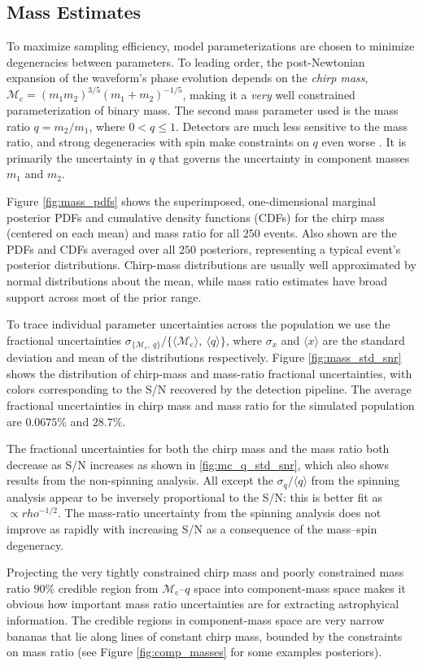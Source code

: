 \subsection{Mass Estimates}\label{sec:mass}
To maximize sampling efficiency, model parameterizations are chosen to minimize degeneracies between parameters.  To leading order, the post-Newtonian expansion of the waveform's phase evolution depends on the \emph{chirp mass}, $\mathcal{M}_\mathrm{c} = (m_1 m_2)^{3/5} (m_1 + m_2)^{-1/5}$, making it a \emph{very} well constrained parameterization of binary mass.  The second mass parameter used is the mass ratio $q = m_2/m_1$, where $0 < q \leq 1$.  Detectors are much less sensitive to the mass ratio, and strong degeneracies with spin make constraints on $q$ even worse \citep{Cutler_1994}.  It is primarily the uncertainty in $q$ that governs the uncertainty in component masses $m_1$ and $m_2$.

Figure \ref{fig:mass_pdfs} shows the superimposed, one-dimensional marginal posterior PDFs and cumulative density functions (CDFs) for the chirp mass (centered on each mean) and mass ratio for all $250$ events.  Also shown are the PDFs and CDFs averaged over all $250$ posteriors, representing a typical event's posterior distributions.  Chirp-mass distributions are usually well approximated by normal distributions about the mean, while mass ratio estimates have broad support across most of the prior range.

To trace individual parameter uncertainties across the population we use the fractional uncertainties $\sigma_{\{\mathcal{M}_\mathrm{c},~q\}}/\{\langle\mathcal{M}_\mathrm{c}\rangle,~\langle q\rangle\}$, where $\sigma_x$ and $\langle x\rangle$ are the standard deviation and mean of the distributions respectively.  Figure \ref{fig:mass_std_snr} shows the distribution of chirp-mass and mass-ratio fractional uncertainties, with colors corresponding to the S/N recovered by the detection pipeline. The average fractional uncertainties in chirp mass and mass ratio for the simulated population are $0.0675\%$ and $28.7\%$.

The fractional uncertainties for both the chirp mass and the mass ratio both decrease as S/N increases as shown in \ref{fig:mc_q_std_snr}, which also shows results from the non-spinning analysis. All except the $\sigma_q/\langle q\rangle$ from the spinning analysis appear to be inversely proportional to the S/N: this is better fit as $\propto rho^{-1/2}$. The mass-ratio uncertainty from the spinning analysis does not improve as rapidly with increasing S/N as a consequence of the mass--spin degeneracy.
  
Projecting the very tightly constrained chirp mass and poorly constrained mass ratio $90\%$ credible region from $\mathcal{M}_\mathrm{c}$--$q$ space into component-mass space makes it obvious how important mass ratio uncertainties are for extracting astrophyical information.  The credible regions in component-mass space are very narrow bananas that lie along lines of constant chirp mass, bounded by the constraints on mass ratio (see Figure \ref{fig:comp_masses} for some examples posteriors).
  
  
  
  
  
  